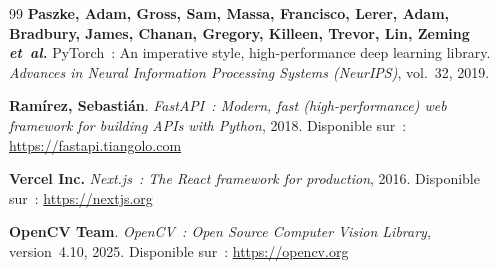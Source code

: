 \begin{thebibliography}{99}
\textbf{Paszke, Adam, Gross, Sam, Massa, Francisco, Lerer, Adam,
Bradbury, James, Chanan, Gregory, Killeen, Trevor, Lin, Zeming
\textit{et~al.}}
PyTorch~: An imperative style, high-performance deep learning library.
\textit{Advances in Neural Information Processing Systems (NeurIPS)},
vol.~32, 2019.

\textbf{Ram\'irez, Sebasti\'an}.
\textit{FastAPI~: Modern, fast (high-performance) web framework for
building APIs with Python}, 2018.
Disponible sur~: \url{https://fastapi.tiangolo.com}

\textbf{Vercel Inc.}
\textit{Next.js~: The React framework for production}, 2016.
Disponible sur~: \url{https://nextjs.org}

\textbf{OpenCV Team}.
\textit{OpenCV~: Open Source Computer Vision Library}, version~4.10, 2025.
Disponible sur~: \url{https://opencv.org}

\end{thebibliography}
